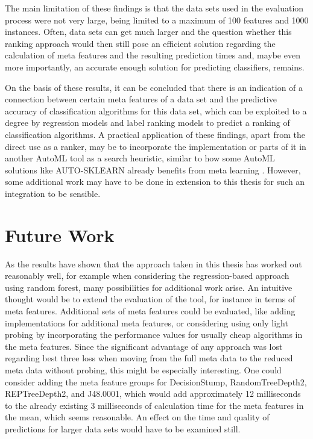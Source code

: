 The main limitation of these findings is that the data sets used in the evaluation process were not very large, being limited to a maximum of 100 features and 1000 instances. Often, data sets can get much larger and the question whether this ranking approach would then still pose an efficient solution regarding the calculation of meta features and the resulting prediction times and, maybe even more importantly, an accurate enough solution for predicting classifiers, remains. 

On the basis of these results, it can be concluded that there is an indication of a connection between certain meta features of a data set and the predictive accuracy of classification algorithms for this data set, which can be exploited to a degree by regression models and label ranking models to predict a ranking of classification algorithms. A practical application of these findings, apart from the direct use as a ranker, may be to incorporate the implementation or parts of it in another AutoML tool as a search heuristic, similar to how some AutoML solutions like AUTO-SKLEARN already benefits from meta learning \cite{feurer2015efficient}. However, some additional work may have to be done in extension to this thesis for such an integration to be sensible.

\section{Future Work}
\label{sec:conclusion:future}
As the results have shown that the approach taken in this thesis has worked out reasonably well, for example when considering the regression-based approach using random forest, many possibilities for additional work arise. An intuitive thought would be to extend the evaluation of the tool, for instance in terms of meta features. Additional sets of meta features could be evaluated, like adding implementations for additional meta features, or considering using only light probing by incorporating the performance values for usually cheap algorithms in the meta features. Since the significant advantage of any approach was lost regarding best three loss when moving from the full meta data to the reduced meta data without probing, this might be especially interesting. One could consider adding the meta feature groups for DecisionStump, RandomTreeDepth2, REPTreeDepth2, and J48.0001, which would add approximately 12 milliseconds to the already existing 3 milliseconds of calculation time for the meta features in the mean, which seems reasonable. An effect on the time and quality of predictions for larger data sets would have to be examined still.

